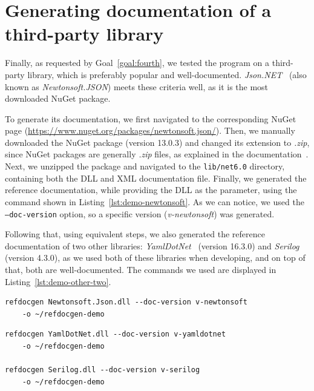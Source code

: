 \section{Generating documentation of a third-party library}
\label{sec:evaluation-third-party}

Finally, as requested by Goal~\ref{goal:fourth}, we tested the program on a third-party library, which is preferably popular and well-documented.
\textit{Json.NET}~\cite{newtonsoft} (also known as \textit{Newtonsoft.JSON}) meets these criteria well, 
as it is the most downloaded NuGet package.

To generate its documentation, we first navigated to the corresponding NuGet page (\url{https://www.nuget.org/packages/newtonsoft.json/}).
Then, we manually downloaded the NuGet package (version 13.0.3) and changed its extension to \textit{.zip}, since NuGet packages are generally \textit{.zip} files, as explained in the documentation~\cite{nuget_zip_docs}.
Next, we unzipped the package and navigated to the \texttt{lib/net6.0} directory, containing both the DLL and XML documentation file.
Finally, we generated the reference documentation, while providing the DLL as the parameter, using the command shown in Listing~\ref{lst:demo-newtonsoft}.
As we can notice, we used \linebreak the \texttt{--doc-version} option, so a specific version (\textit{v-newtonsoft}) was generated.

Following that, using equivalent steps, we also generated the reference documentation of two other libraries: \textit{YamlDotNet}~\cite{yamldotnet} (version 16.3.0) and \textit{Serilog}~\cite{serilog} (version 4.3.0), as we used both of these libraries when developing, and on top of that, both are well-documented.
The commands we used are displayed in Listing~\ref{lst:demo-other-two}.

\begin{listing}[H]
\begin{lstlisting}[language=XML]
refdocgen Newtonsoft.Json.dll --doc-version v-newtonsoft
    -o ~/refdocgen-demo
\end{lstlisting}
\caption{Generating reference documentation of \textit{Newtonsoft.JSON}}
\label{lst:demo-newtonsoft}
\end{listing}

\begin{listing}[H]
\begin{lstlisting}[language=XML]
refdocgen YamlDotNet.dll --doc-version v-yamldotnet
    -o ~/refdocgen-demo
 
refdocgen Serilog.dll --doc-version v-serilog
    -o ~/refdocgen-demo
\end{lstlisting}
\caption{Generating reference documentation of \textit{YamlDotNet} and \textit{Serilog}}
\label{lst:demo-other-two}
\end{listing}

